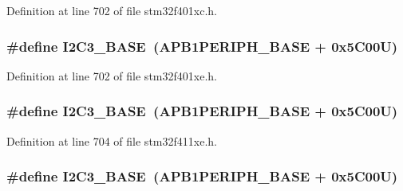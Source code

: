 Definition at line 702 of file stm32f401xc.\+h.

\subsubsection[{\texorpdfstring{I2\+C3\+\_\+\+B\+A\+SE}{I2C3_BASE}}]{\setlength{\rightskip}{0pt plus 5cm}\#define I2\+C3\+\_\+\+B\+A\+SE~({\bf A\+P\+B1\+P\+E\+R\+I\+P\+H\+\_\+\+B\+A\+SE} + 0x5\+C00\+U)}\hypertarget{group___peripheral__registers__structures_ga4e8b9198748235a1729e1e8f8f24983b}{}\label{group___peripheral__registers__structures_ga4e8b9198748235a1729e1e8f8f24983b}


Definition at line 702 of file stm32f401xe.\+h.

\subsubsection[{\texorpdfstring{I2\+C3\+\_\+\+B\+A\+SE}{I2C3_BASE}}]{\setlength{\rightskip}{0pt plus 5cm}\#define I2\+C3\+\_\+\+B\+A\+SE~({\bf A\+P\+B1\+P\+E\+R\+I\+P\+H\+\_\+\+B\+A\+SE} + 0x5\+C00\+U)}\hypertarget{group___peripheral__registers__structures_ga4e8b9198748235a1729e1e8f8f24983b}{}\label{group___peripheral__registers__structures_ga4e8b9198748235a1729e1e8f8f24983b}


Definition at line 704 of file stm32f411xe.\+h.

\subsubsection[{\texorpdfstring{I2\+C3\+\_\+\+B\+A\+SE}{I2C3_BASE}}]{\setlength{\rightskip}{0pt plus 5cm}\#define I2\+C3\+\_\+\+B\+A\+SE~({\bf A\+P\+B1\+P\+E\+R\+I\+P\+H\+\_\+\+B\+A\+SE} + 0x5\+C00\+U)}\hypertarget{group___peripheral__registers__structures_ga4e8b9198748235a1729e1e8f8f24983b}{}\label{group___peripheral__registers__structures_ga4e8b9198748235a1729e1e8f8f24983b}


